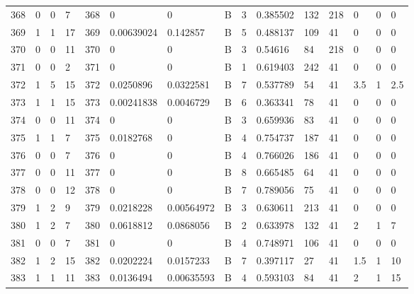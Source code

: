 \begin{latin}
\begin{longtable}{lllllllllllllll}
	368 & 0  & 0   & 7  & 368 & 0              & 0              & B & 3  & 0.385502 & 132  & 218  & 0       & 0       & 0       \\
	369 & 1  & 1   & 17 & 369 & 0.00639024     & 0.142857       & B & 5  & 0.488137 & 109  & 41   & 0       & 0       & 0       \\
	370 & 0  & 0   & 11 & 370 & 0              & 0              & B & 3  & 0.54616  & 84   & 218  & 0       & 0       & 0       \\
	371 & 0  & 0   & 2  & 371 & 0              & 0              & B & 1  & 0.619403 & 242  & 41   & 0       & 0       & 0       \\
	372 & 1  & 5   & 15 & 372 & 0.0250896      & 0.0322581      & B & 7  & 0.537789 & 54   & 41   & 3.5     & 1       & 2.5     \\
	373 & 1  & 1   & 15 & 373 & 0.00241838     & 0.0046729      & B & 6  & 0.363341 & 78   & 41   & 0       & 0       & 0       \\
	374 & 0  & 0   & 11 & 374 & 0              & 0              & B & 3  & 0.659936 & 83   & 41   & 0       & 0       & 0       \\
	375 & 1  & 1   & 7  & 375 & 0.0182768      & 0              & B & 4  & 0.754737 & 187  & 41   & 0       & 0       & 0       \\
	376 & 0  & 0   & 7  & 376 & 0              & 0              & B & 4  & 0.766026 & 186  & 41   & 0       & 0       & 0       \\
	377 & 0  & 0   & 11 & 377 & 0              & 0              & B & 8  & 0.665485 & 64   & 41   & 0       & 0       & 0       \\
	378 & 0  & 0   & 12 & 378 & 0              & 0              & B & 7  & 0.789056 & 75   & 41   & 0       & 0       & 0       \\
	379 & 1  & 2   & 9  & 379 & 0.0218228      & 0.00564972     & B & 3  & 0.630611 & 213  & 41   & 0       & 0       & 0       \\
	380 & 1  & 2   & 7  & 380 & 0.0618812      & 0.0868056      & B & 2  & 0.633978 & 132  & 41   & 2       & 1       & 7       \\
	381 & 0  & 0   & 7  & 381 & 0              & 0              & B & 4  & 0.748971 & 106  & 41   & 0       & 0       & 0       \\
	382 & 1  & 2   & 15 & 382 & 0.0202224      & 0.0157233      & B & 7  & 0.397117 & 27   & 41   & 1.5     & 1       & 10      \\
	383 & 1  & 1   & 11 & 383 & 0.0136494      & 0.00635593     & B & 4  & 0.593103 & 84   & 41   & 2       & 1       & 15      \\

\end{longtable}
\end{latin}
